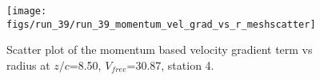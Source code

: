 \begin{figure}[H]
\centering
\texttt{[image: figs/run\_39/run\_39\_momentum\_vel\_grad\_vs\_r\_meshscatter]}
\caption{Scatter plot of the momentum based velocity gradient term vs radius at $z/c$=8.50, $V_{free}$=30.87, station 4.}
\label{fig:run_39_momentum_vel_grad_vs_r_meshscatter}
\end{figure}


